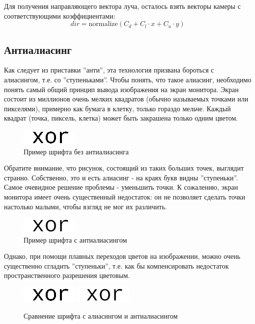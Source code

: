 \documentclass[12pt, a4paper, utf8]{article}
\newcommand{\normalize}{\mathrm{normalize}}
\begin{document}
Для получения направляющего вектора луча, осталось взять векторы камеры с соответствующими коэффициентами:
$$ 
dir = \normalize(C_d + C_l \cdot x + C_u \cdot y)
$$

\subsection{Антиалиасинг}

Как следует из приставки ''анти'', эта технология призвана бороться с алиасингом, т.е. со ''ступеньками''. Чтобы понять, что такое алиасинг, необходимо понять самый общий принцип вывода изображения на экран монитора. Экран состоит из миллионов очень мелких квадратов (обычно называемых точками или пикселями), примерно как бумага в клетку, только гораздо мельче. Каждый квадрат (точка, пиксель, клетка) может быть закрашена только одним цветом.

\begin{figure}[H]
\centering
\includegraphics[scale=4]{imgs/aliasing.png} 
\caption{Пример шрифта без антиалиасинга}\label{fig:font_without_antialiasing}
\end{figure}

Обратите внимание, что рисунок, состоящий из таких больших точек, выглядит странно. Собственно, это и есть алиасинг - на краях букв видны ''ступеньки''.  Самое очевидное решение проблемы - уменьшить точки. К сожалению, экран монитора имеет очень существенный недостаток: он не позволяет сделать точки настолько малыми, чтобы взгляд не мог их различить. 

\begin{figure}[H]
\centering
\includegraphics[scale=4]{imgs/antialiasing.png}
\caption{Пример шрифта с антиалиасингом}\label{fig:font_with_antialiasing}
\end{figure}

Однако, при помощи плавных переходов цветов на изображении, можно очень существенно сгладить ''ступеньки'', т.е. как бы компенсировать недостаток пространственного разрешения цветовым.

\begin{figure}[H]
\centering
\includegraphics[scale=1.0]{imgs/aliasing.png} 
\includegraphics[scale=1.0]{imgs/antialiasing.png}
\caption{Сравнение шрифта с алиасингом и антиалиасингом}\label{fig:compare_font}
\end{figure}
\end{document}
